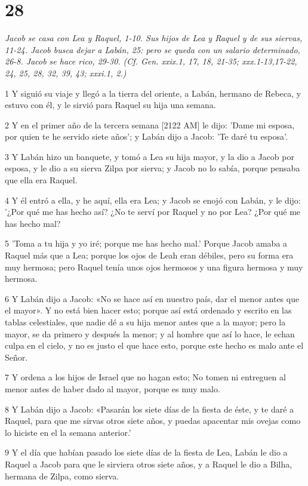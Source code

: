 \chapter{28}

\par \textit{Jacob se casa con Lea y Raquel, 1-10. Sus hijos de Lea y Raquel y de sus siervas, 11-24. Jacob busca dejar a Labán, 25: pero se queda con un salario determinado, 26-8. Jacob se hace rico, 29-30. (Cf. Gen. xxix.1, 17, 18, 21-35; xxx.1-13,17-22, 24, 25, 28, 32, 39, 43; xxxi.1, 2.)}

\par 1 Y siguió su viaje y llegó a la tierra del oriente, a Labán, hermano de Rebeca, y estuvo con él, y le sirvió para Raquel su hija una semana.
\par 2 Y en el primer año de la tercera semana [2122 AM] le dijo: 'Dame mi esposa, por quien te he servido siete años'; y Labán dijo a Jacob: 'Te daré tu esposa'.
\par 3 Y Labán hizo un banquete, y tomó a Lea su hija mayor, y la dio a Jacob por esposa, y le dio a su sierva Zilpa por sierva; y Jacob no lo sabía, porque pensaba que ella era Raquel.
\par 4 Y él entró a ella, y he aquí, ella era Lea; y Jacob se enojó con Labán, y le dijo: '¿Por qué me has hecho así? ¿No te serví por Raquel y no por Lea? ¿Por qué me has hecho mal?
\par 5 'Toma a tu hija y yo iré; porque me has hecho mal.' Porque Jacob amaba a Raquel más que a Lea; porque los ojos de Leah eran débiles, pero su forma era muy hermosa; pero Raquel tenía unos ojos hermosos y una figura hermosa y muy hermosa.
\par 6 Y Labán dijo a Jacob: «No se hace así en nuestro país, dar el menor antes que el mayor». Y no está bien hacer esto; porque así está ordenado y escrito en las tablas celestiales, que nadie dé a su hija menor antes que a la mayor; pero la mayor, se da primero y después la menor; y al hombre que así lo hace, le echan culpa en el cielo, y no es justo el que hace esto, porque este hecho es malo ante el Señor.
\par 7 Y ordena a los hijos de Israel que no hagan esto; No tomen ni entreguen al menor antes de haber dado al mayor, porque es muy malo.
\par 8 Y Labán dijo a Jacob: «Pasarán los siete días de la fiesta de éste, y te daré a Raquel, para que me sirvas otros siete años, y puedas apacentar mis ovejas como lo hiciste en el la semana anterior.'
\par 9 Y el día que habían pasado los siete días de la fiesta de Lea, Labán le dio a Raquel a Jacob para que le sirviera otros siete años, y a Raquel le dio a Bilha, hermana de Zilpa, como sierva.
